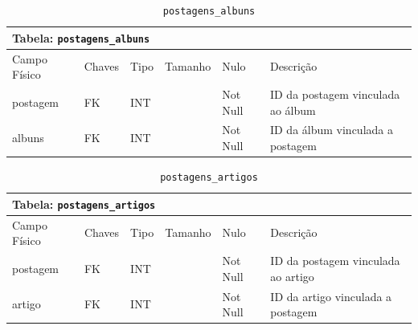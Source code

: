 \documentclass[12pt,a4paper]{article}
\begin{document}
\begin{center}
\begin{table}[h!]
	\caption{\texttt{postagens\_albuns}}
	\label{tabela:postagensAlbuns}
	\begin{tabular}{|p{2.3cm}|p{1.2cm}|p{1.8cm}|p{1.5cm}|p{1cm}|p{6cm}|}\hline	
		\multicolumn{6}{|p{16cm}|}{\cellcolor{cinzaClaro}  \centering Tabela: \texttt{postagens\_albuns}} \\ \hline %
		{\small Campo Físico}   & {\small Chaves} & {\small Tipo} & {\small Tamanho} & {\small Nulo} & {\small Descrição}\\\hline %
		
		{\tiny postagem} & {\tiny FK} & {\tiny INT} & {\tiny } & {\tiny Not Null} &{\tiny ID da postagem vinculada ao álbum}\\\hline
		{\tiny albuns} & {\tiny FK} & {\tiny INT} & {\tiny } & {\tiny Not Null} &{\tiny ID da álbum vinculada a postagem}\\\hline
			
	\end{tabular}
\end{table}	
\end{center}

\begin{center}
\begin{table}[h!]
	\caption{\texttt{postagens\_artigos}}
	\label{tabela:postagensArtigos}
	\begin{tabular}{|p{2.3cm}|p{1.2cm}|p{1.8cm}|p{1.5cm}|p{1cm}|p{6cm}|}\hline	
		\multicolumn{6}{|p{16cm}|}{\cellcolor{cinzaClaro}  \centering Tabela: \texttt{postagens\_artigos}} \\ \hline %
		{\small Campo Físico}   & {\small Chaves} & {\small Tipo} & {\small Tamanho} & {\small Nulo} & {\small Descrição}\\\hline %
		
		{\tiny postagem} & {\tiny FK} & {\tiny INT} & {\tiny } & {\tiny Not Null} &{\tiny ID da postagem vinculada ao artigo}\\\hline
		{\tiny artigo} & {\tiny FK} & {\tiny INT} & {\tiny } & {\tiny Not Null} &{\tiny ID da artigo vinculada a postagem}\\\hline
		
			
	\end{tabular}
\end{table}	
\end{center}
\end{document}
